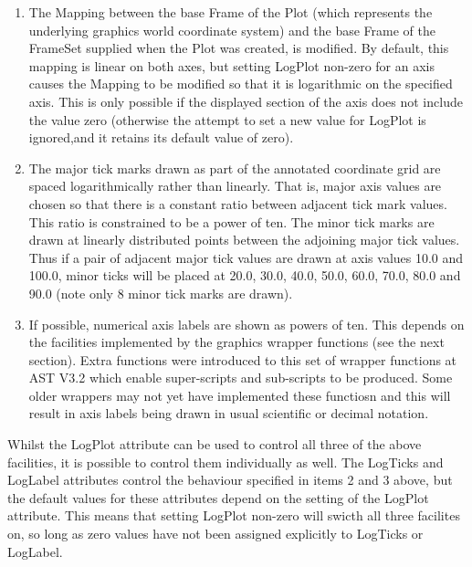 \documentclass[twoside,11pt]{starlink}
\begin{document}
\begin{enumerate}

\item The Mapping between the base Frame of the Plot (which represents
the underlying graphics world coordinate system) and the base Frame of
the FrameSet supplied when the Plot was created, is modified. By
default, this mapping is linear on both axes, but setting LogPlot non-zero
for an axis causes the Mapping to be modified so that it is logarithmic
on the specified axis. This is only possible if the displayed section of
the axis does not include the value zero (otherwise the attempt to set
a new value for LogPlot is ignored,and it retains its default value of
zero).

\item The major tick marks drawn as part of the annotated coordinate grid
are spaced logarithmically rather than linearly. That is, major axis
values are chosen so that there is a constant ratio between adjacent
tick mark values. This ratio is constrained to be a power of ten. The
minor tick marks are drawn at linearly distributed points between the
adjoining major tick values. Thus if a pair of adjacent major tick values
are drawn at axis values 10.0 and 100.0, minor ticks will be placed at
20.0, 30.0, 40.0, 50.0, 60.0, 70.0, 80.0 and 90.0 (note only 8 minor tick
marks are drawn).

\item If possible, numerical axis labels are shown as powers of ten.
This depends on the facilities implemented by the graphics wrapper
functions (see the next section). Extra functions were introduced to this
set of wrapper functions at AST V3.2 which enable super-scripts and
sub-scripts to be produced. Some older wrappers may not yet have
implemented these functiosn and this will result in axis labels being
drawn in usual scientific or decimal notation.

\end{enumerate}

Whilst the LogPlot attribute can be used to control all three of the above
facilities, it is possible to control them individually as well. The
LogTicks and LogLabel attributes control the behaviour specified in items
2 and 3 above, but the default values for these attributes depend on the
setting of the LogPlot attribute. This means that setting LogPlot
non-zero will swicth all three facilites on, so long as zero values have
not been assigned explicitly to LogTicks or LogLabel.
\end{document}
